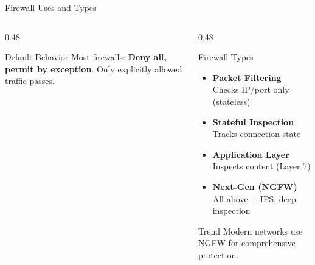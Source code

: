 \documentclass[aspectratio=169]{beamer}  %
\begin{document}
\begin{frame}{Firewall Uses and Types}
\begin{columns}[T]
\begin{column}{0.48\textwidth}
            \vspace{0.2em}
            \begin{alertblock}{Default Behavior}
                \small
                Most firewalls: \textbf{Deny all, permit by exception}. Only explicitly allowed traffic passes.
            \end{alertblock}
        \end{column}
        \begin{column}{0.48\textwidth}
            \begin{block}{Firewall Types}
                \small
                \begin{itemize}\setlength{\itemsep}{3pt}
                    \item \textbf{Packet Filtering} \\
                        {\scriptsize Checks IP/port only (stateless)}
                    \item \textbf{Stateful Inspection} \\
                        {\scriptsize Tracks connection state}
                    \item \textbf{Application Layer} \\
                        {\scriptsize Inspects content (Layer 7)}
                    \item \textbf{Next-Gen (NGFW)} \\
                        {\scriptsize All above + IPS, deep inspection}
                \end{itemize}
            \end{block}
            
            \vspace{0.2em}
            \begin{exampleblock}{Trend}
                \small
                Modern networks use NGFW for comprehensive protection.
            \end{exampleblock}
        \end{column}
    \end{columns}
\end{frame}
\end{document}
